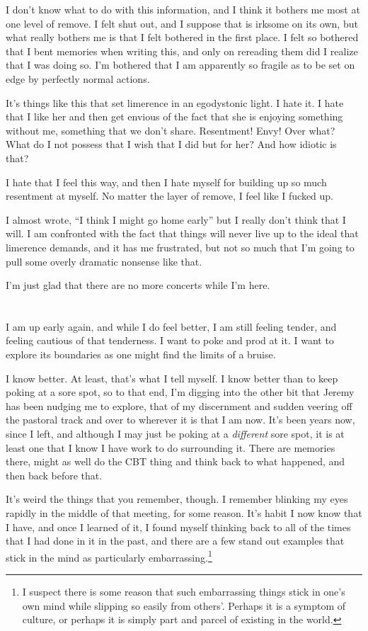 I don't know what to do with this information, and I think it bothers me most at one level of remove. I felt shut out, and I suppose that is irksome on its own, but what really bothers me is that I felt bothered in the first place. I felt so bothered that I bent memories when writing this, and only on rereading them did I realize that I was doing so. I'm bothered that I am apparently so fragile as to be set on edge by perfectly normal actions.

It's things like this that set limerence in an egodystonic light. I hate it. I hate that I like her and then get envious of the fact that she is enjoying something without me, something that we don't share. Resentment! Envy! Over what? What do I not possess that I wish that I did but for her? And how idiotic is that?

I hate that I feel this way, and then I hate myself for building up so much resentment at myself. No matter the layer of remove, I feel like I fucked up.

I almost wrote, ``I think I might go home early'' but I really don't think that I will. I am confronted with the fact that things will never live up to the ideal that limerence demands, and it has me frustrated, but not so much that I'm going to pull some overly dramatic nonsense like that.

I'm just glad that there are no more concerts while I'm here.

\section{}

I am up early again, and while I do feel better, I am still feeling tender, and feeling cautious of that tenderness. I want to poke and prod at it. I want to explore its boundaries as one might find the limits of a bruise.

I know better. At least, that's what I tell myself. I know better than to keep poking at a sore spot, so to that end, I'm digging into the other bit that Jeremy has been nudging me to explore, that of my discernment and sudden veering off the pastoral track and over to wherever it is that I am now. It's been years now, since I left, and although I may just be poking at a \emph{different} sore spot, it is at least one that I know I have work to do surrounding it. There are memories there, might as well do the CBT thing and think back to what happened, and then back before that.

It's weird the things that you remember, though. I remember blinking my eyes rapidly in the middle of that meeting, for some reason. It's habit I now know that I have, and once I learned of it, I found myself thinking back to all of the times that I had done in it in the past, and there are a few stand out examples that stick in the mind as particularly embarrassing.\footnote{I suspect there is some reason that such embarrassing things stick in one's own mind while slipping so easily from others'. Perhaps it is a symptom of culture, or perhaps it is simply part and parcel of existing in the world.}

